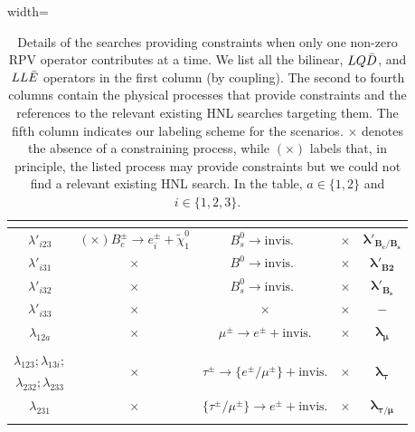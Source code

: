 \begin{table}[!ht]
\begin{adjustbox}{width=\columnwidth}
\begin{tabular}{|c|c|c|c|c|}
&&& \cite{Ballett:2019bgd, Kling:2018wct, DeVries:2020jbs, Beltran:2023nli} &\\[0.15cm]
\hline
$\lambda'_{i23}$ & $\left(\bm{\times}\right) B_c^\pm\to e^\pm_i + \tilde{\chi}^0_1$ & $B_s^0\to \text{invis.}$~\cite{Workman:2022ynf} & $\bm{\times}$ & $\bm{\lambda'_{B_c/B_s}}$\\[0.15 cm]
\hline
$\lambda'_{i31}$ & $\bm{\times}$ & $B^0\to \text{invis.}$~\cite{BaBar:2012yut} & $\bm{\times}$ & $\bm{\lambda'_{B2}}$\\[0.15 cm]
\hline
$\lambda'_{i32}$ & $\bm{\times}$ & $B^0_s\to \text{invis.}$~\cite{Workman:2022ynf} & $\bm{\times}$ & $\bm{\lambda'_{B_s}}$\\[0.15 cm]
\hline
$\lambda'_{i33}$ & $\bm{\times}$ & $\bm{\times}$ & $\bm{\times}$ & $\bm{-}$\\[0.15 cm]
\hline
$\lambda_{12a}$ & $\bm{\times}$ & $\mu^\pm \to e^\pm + \text{invis.}$
& $\bm{\times}$ & $\bm{\lambda_{\mu}}$\\[0.15 cm]
&&\cite{Workman:2022ynf}&& \\
\hline
$\lambda_{123}; \lambda_{13i};$ & \multirow{2}{*}{$\bm{\times}$} & \multirow{2}{*}{$\tau^\pm \to \{e^\pm/\mu^\pm\} + \text{invis.}$}
& \multirow{2}{*}{$\bm{\times}$} & \multirow{2}{*}{$\bm{\lambda_{\tau}}$}\\[0.21 cm]
$\lambda_{232}; \lambda_{233}$ & & \cite{Workman:2022ynf} & &\\[0.15 cm]
\hline
$\lambda_{231}$ & $\bm{\times}$ & $\{\tau^\pm/\mu^\pm\} \to e^\pm + \text{invis.}$
& $\bm{\times}$ & $\bm{\lambda_{\tau/\mu}}$\\[0.15 cm]
&&\cite{Workman:2022ynf}&& \\
\hline
\end{tabular}
\end{adjustbox}
\caption{Details of the searches providing constraints when only one non-zero RPV operator contributes
at a time. We list all the bilinear, $LQ\Bar{D}$, and $LL\Bar{E}$ operators in the first column (by coupling).
The second to fourth columns contain the physical processes that provide constraints and the references to the relevant 
existing HNL searches targeting them. The fifth column indicates our labeling scheme for the scenarios.
$\bm{\times}$ denotes the absence of a constraining process, while $\left(\bm{\times}\right)$ labels that, 
in principle, the listed process may provide constraints but we could not find a relevant existing HNL search.
In the table, $a\in\{1,2\}$ and $i\in\{1,2,3\}$.}
\label{tab:single_couplings_BMs}
\end{table}


